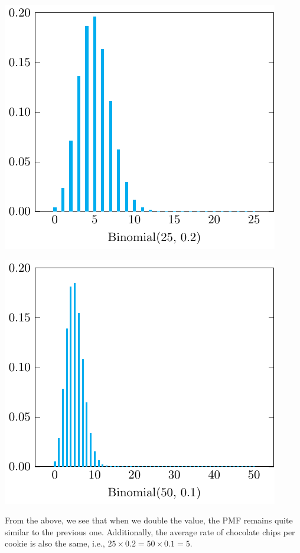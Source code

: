 \begin{minipage}{0.5\textwidth}
  \includegraphics{Figures/PMF_Binomial_25_02.pdf}
\end{minipage}
\begin{minipage}{0.5\textwidth}
  \includegraphics{Figures/PMF_Binomial_50_01.pdf}
\end{minipage}

From the above, we see that when we double the value, the PMF remains quite similar to the previous one. Additionally, the average rate of chocolate chips per cookie is also the same, i.e., \(25 \times 0.2 = 50 \times 0.1 = 5\). 

